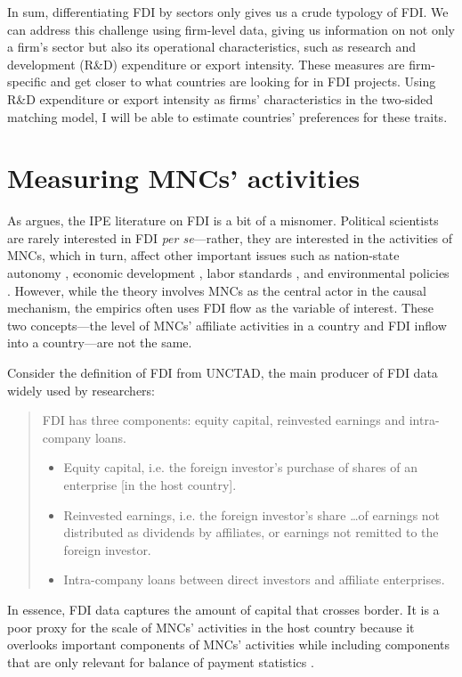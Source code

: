 In sum, differentiating FDI by sectors only gives us a crude typology of FDI. We
can address this challenge using firm-level data, giving us information on not
only a firm's sector but also its operational characteristics, such as research
and development (R\&D) expenditure or export intensity. These measures are
firm-specific and get closer to what countries are looking for in FDI projects.
Using R\&D expenditure or export intensity as firms' characteristics in the
two-sided matching model, I will be able to estimate countries' preferences for
these traits.

\section{Measuring MNCs' activities}

As \citet{Kerner2014} argues, the IPE literature on FDI is a bit of a misnomer.
Political scientists are rarely interested in FDI \textit{per se}---rather, they
are interested in the activities of MNCs, which in turn, affect other important
issues such as nation-state autonomy \citep{Mosley2005}, economic development
\citep{Moran1998}, labor standards \citep{Mosley2007}, and environmental
policies \citep{Prakash2007}. However, while the theory involves MNCs as the
central actor in the causal mechanism, the empirics often uses FDI flow as the
variable of interest. These two concepts---the level of MNCs' affiliate
activities in a country and FDI inflow into a country---are not the same.

Consider the definition of FDI from UNCTAD, the main producer of FDI data widely
used by researchers:

\begin{quote} FDI has three components: equity capital, reinvested earnings and
  intra-company loans.
  \begin{itemize}
  \item Equity capital, i.e. the foreign investor’s purchase of shares of an
    enterprise [in the host country].
  \item Reinvested earnings, i.e. the foreign investor’s share \ldots of
    earnings not distributed as dividends by affiliates, or earnings not
    remitted to the foreign investor.
  \item Intra-company loans between direct investors and affiliate enterprises.
  \end{itemize} \citep[245]{UNCTAD2007}
\end{quote}

In essence, FDI data captures the amount of capital that crosses border. It is a
poor proxy for the scale of MNCs' activities in the host country because it
overlooks important components of MNCs' activities while including components
that are only relevant for balance of payment statistics
\citep{Beugelsdijk2010}.

